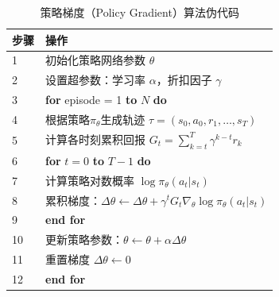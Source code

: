 \begin{table}[htbp]
\centering
\caption{策略梯度（Policy Gradient）算法伪代码}
\label{tab:policy_gradient}
\begin{tabular}{lp{}}
\toprule
\textnormal{步骤} & \textnormal{操作} \\
\midrule
1 & 初始化策略网络参数 $\theta$ \\
2 & 设置超参数：学习率 $\alpha$，折扣因子 $\gamma$ \\
3 & \textbf{for} episode = 1 \textbf{to} $N$ \textbf{do} \\
4 & \quad 根据策略$\pi_\theta$生成轨迹 $\tau = (s_0,a_0,r_1,\dots,s_T)$ \\
5 & \quad 计算各时刻累积回报 $G_t = \sum_{k=t}^{T} \gamma^{k-t} r_k$ \\
6 & \quad \textbf{for} $t = 0$ \textbf{to} $T-1$ \textbf{do} \\
7 & \quad\quad 计算策略对数概率 $\log \pi_\theta(a_t|s_t)$ \\
8 & \quad\quad 累积梯度：$\Delta\theta \leftarrow \Delta\theta + \gamma^t G_t \nabla_\theta \log \pi_\theta(a_t|s_t)$ \\
9 & \quad \textbf{end for} \\
10 & \quad 更新策略参数：$\theta \leftarrow \theta + \alpha \Delta\theta$ \\
11 & \quad 重置梯度 $\Delta\theta \leftarrow 0$ \\
12 & \textbf{end for} \\
\bottomrule
\end{tabular}
\end{table}

